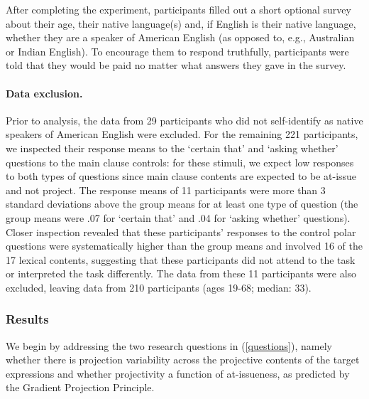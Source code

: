 \documentclass[11pt,fleqn]{article}
\newcommand{\6}{\mbox{$[\hspace*{-.6mm}[$}}
\newcommand{\9}{\mbox{$]\hspace*{-.6mm}]$}}
\begin{document}
After completing the experiment, participants filled out a short optional survey about their age, their native language(s) and, if English is their native language, whether they are a speaker of American English (as opposed to, e.g., Australian or Indian English). To encourage them to respond truthfully, participants were told that they would be paid no matter what answers they gave in the survey.

\paragraph{Data exclusion.}
Prior to analysis, the data from 29 participants who did not self-identify as native speakers of American English were excluded. For the remaining 221 participants, we inspected their response means to the `certain that' and `asking whether' questions 
to the main clause controls: for these stimuli, we expect low responses to both types of questions since main clause contents are expected to be at-issue and not project. The response means of 11 participants were more than 3 standard deviations above the group means for at least one type of question (the group means were .07 for `certain that' and .04 for `asking whether' questions). Closer inspection revealed that these participants' responses to the control polar questions were systematically higher than the group means and involved 16 of the 17 lexical contents, suggesting that these participants did not attend to the task or interpreted the task differently. The data from these 11 participants were also excluded, leaving data from 210 participants (ages 19-68; median: 33).  


\subsubsection{Results}

We begin by addressing the two research questions in (\ref{questions}), namely whether there is projection variability across the projective contents of the target expressions and whether projectivity a function of at-issueness, as predicted by the Gradient Projection Principle. 
\end{document}
